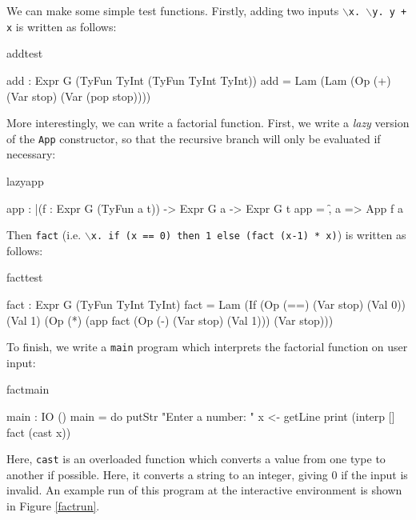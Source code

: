 \noindent
We can make some simple test functions. Firstly, adding two inputs
\texttt{$\backslash$x. $\backslash$y. y + x} is written as follows:

\begin{SaveVerbatim}{addtest}

add : Expr G (TyFun TyInt (TyFun TyInt TyInt))
add = Lam (Lam (Op (+) (Var stop) (Var (pop stop))))
  
\end{SaveVerbatim}

\noindent
More interestingly, we can write a factorial function. First, we write a \emph{lazy}
version of the \texttt{App} constructor, so that the recursive branch will only
be evaluated if necessary:

\begin{SaveVerbatim}{lazyapp}
 
app : |(f : Expr G (TyFun a t)) -> Expr G a -> Expr G t
app = \f, a => App f a

\end{SaveVerbatim}

\noindent
Then \texttt{fact} 
(i.e. \texttt{$\backslash$x. if (x == 0) then 1 else (fact (x-1) * x)})
is written as follows:

\begin{SaveVerbatim}{facttest}

fact : Expr G (TyFun TyInt TyInt)
fact = Lam (If (Op (==) (Var stop) (Val 0))
               (Val 1) (Op (*) (app fact (Op (-) (Var stop) (Val 1))) 
                               (Var stop)))

\end{SaveVerbatim}

To finish, we write a \texttt{main} program which interprets the factorial function
on user input:

\begin{SaveVerbatim}{factmain}

main : IO ()
main = do putStr "Enter a number: "
          x <- getLine
          print (interp [] fact (cast x)) 

\end{SaveVerbatim}

\noindent
Here, \texttt{cast} is an overloaded function which converts a value from one
type to another if possible. Here, it converts a string to
an integer, giving 0 if the input is invalid. An example run of this program
at the \Idris{} interactive environment is shown in Figure \ref{factrun}.

